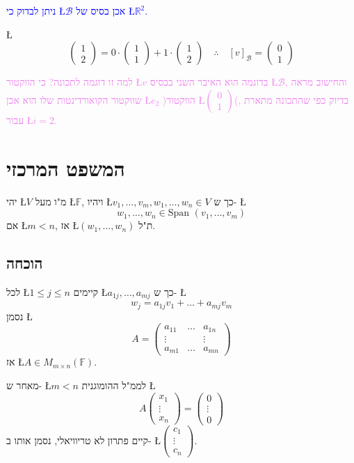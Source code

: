 \documentclass[english,hebrew]{article}
\newcommand{\spn}{\text{Span }}
\begin{document}
\textcolor{blue}{ניתן לבדוק כי \L{$\mathcal{B}$} אכן בסיס של \L{$\mathbb{R}^{2}$}.}

\L{%
\[
\begin{pmatrix}1\\
2
\end{pmatrix}=0\cdot\begin{pmatrix}1\\
1
\end{pmatrix}+1\cdot\begin{pmatrix}1\\
2
\end{pmatrix}\quad\therefore\quad[v]_{\mathcal{B}}=\begin{pmatrix}0\\
1
\end{pmatrix}
\]
}%

\textcolor{violet}{למה זו דוגמה לתכונה? כי הווקטור \L{$v$} בדוגמה
הוא האיבר השני בבסיס \L{$\mathcal{B}$}, והחישוב מראה שווקטור הקואורדינטות
שלו הוא אכן \L{$e_{2}$} )הווקטור \L{$\begin{pmatrix}0\\
1
\end{pmatrix}$}(, בדיוק כפי שהתכונה מתארת עבור \L{$i=2$}.}

\section{המשפט המרכזי}
יהי \L{$V$} מ"ו מעל \L{$\mathbb{F}$}, ויהיו \L{$v_{1},\dots,v_{m},w_{1},\dots,w_{n}\in V$}
כך ש- \L{%
\[
w_{1},\dots,w_{n}\in\spn(v_{1},\dots,v_{m})
\]
}%
אם \L{$m<n$}, אז \L{$(w_{1},\dots,w_{n})$} ת"ל.

\subsection{הוכחה}

לכל \L{$1\le j\le n$} קיימים \L{$a_{1j},\dots,a_{mj}$} כך ש- \L{%
\[
w_{j}=a_{1j}v_{1}+\dots+a_{mj}v_{m}
\]
}%
נסמן \L{%
\[
A=\begin{pmatrix}a_{11} & \dots & a_{1n}\\
\vdots &  & \vdots\\
a_{m1} & \dots & a_{mn}
\end{pmatrix}
\]
}%
אז \L{$A\in M_{m\times n}(\mathbb{F})$}.

מאחר ש- \L{$m<n$} לממ"ל ההומוגנית \L{%
\[
A\begin{pmatrix}x_{1}\\
\vdots\\
x_{n}
\end{pmatrix}=\begin{pmatrix}0\\
\vdots\\
0
\end{pmatrix}
\]
}%
קיים פתרון לא טריוויאלי, נסמן אותו ב- \L{$\begin{pmatrix}c_{1}\\
\vdots\\
c_{n}
\end{pmatrix}$}.
\end{document}
